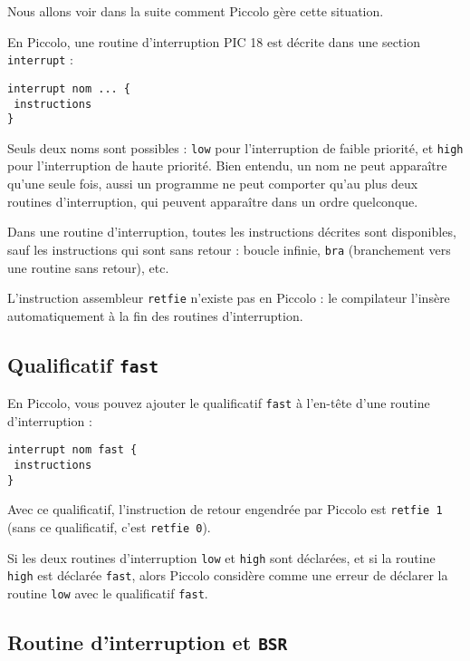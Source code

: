 Nous allons voir dans la suite comment Piccolo gère cette situation.

En Piccolo, une routine d’interruption PIC 18 est décrite dans une section \texttt{interrupt} :

\begin{lstlisting}[language=piccolo]
interrupt nom ... {
 instructions
}
\end{lstlisting}

Seuls deux noms sont possibles : \texttt{low} pour l’interruption de faible priorité, et \texttt{high} pour l’interruption de haute priorité. Bien entendu, un nom ne peut apparaître qu’une seule fois, aussi un programme ne peut comporter qu'au plus deux routines d'interruption, qui peuvent apparaître dans un ordre quelconque.

Dans une routine d'interruption, toutes les instructions décrites sont disponibles, sauf les instructions qui sont sans retour : boucle infinie, \texttt{bra} (branchement vers une routine sans retour), etc.

L’instruction assembleur \texttt{retfie} n’existe pas en Piccolo : le compilateur l’insère automatiquement à la fin des routines d’interruption.



\subsection{Qualificatif \texttt{fast}}

En Piccolo, vous pouvez ajouter le qualificatif \texttt{fast} à l’en-tête d’une routine d’interruption :

\begin{lstlisting}[language=piccolo]
interrupt nom fast {
 instructions
}
\end{lstlisting}

Avec ce qualificatif, l’instruction de retour engendrée par Piccolo est \texttt{retfie 1} (sans ce qualificatif, c’est \texttt{retfie 0}).

Si les deux routines d’interruption \texttt{low} et \texttt{high} sont déclarées, et si la routine \texttt{high} est déclarée \texttt{fast}, alors Piccolo considère comme une erreur de déclarer la routine \texttt{low} avec le qualificatif \texttt{fast}.






\subsection{Routine d'interruption et \texttt{BSR}}

